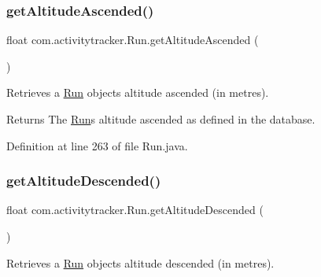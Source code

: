 \subsubsection{\texorpdfstring{getAltitudeAscended()}{getAltitudeAscended()}}
{\footnotesize\ttfamily float com.\+activitytracker.\+Run.\+get\+Altitude\+Ascended (\begin{DoxyParamCaption}{ }\end{DoxyParamCaption})}

Retrieves a \mbox{\hyperlink{classcom_1_1activitytracker_1_1_run}{Run}} object\textquotesingle{}s altitude ascended (in metres).

\begin{DoxyReturn}{Returns}
The \mbox{\hyperlink{classcom_1_1activitytracker_1_1_run}{Run}}\textquotesingle{}s altitude ascended as defined in the database. 
\end{DoxyReturn}


Definition at line 263 of file Run.\+java.


\begin{DoxyCode}{0}

\end{DoxyCode}
\mbox{\label{classcom_1_1activitytracker_1_1_run_a75d18e68f984a4f5481e25f2c70f0492}} 
\subsubsection{\texorpdfstring{getAltitudeDescended()}{getAltitudeDescended()}}
{\footnotesize\ttfamily float com.\+activitytracker.\+Run.\+get\+Altitude\+Descended (\begin{DoxyParamCaption}{ }\end{DoxyParamCaption})}

Retrieves a \mbox{\hyperlink{classcom_1_1activitytracker_1_1_run}{Run}} object\textquotesingle{}s altitude descended (in metres).

